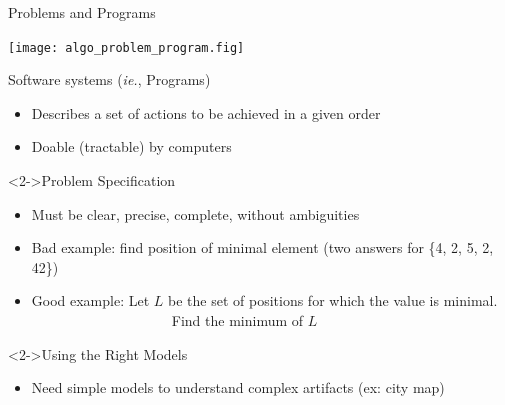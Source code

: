 \begin{frame}[t,squeeze]{Problems and Programs}
  \centerline{\texttt{[image: algo\_problem\_program.fig]}}

  \begin{block}{Software systems {\color{black} (\textit{ie.}, Programs)}}
    \begin{itemize}
    \item Describes a set of actions to be achieved in a given order
    \item Doable (tractable) by computers
    \end{itemize}
  \end{block}\vspace{-.5\baselineskip}

  \begin{block}<2->{Problem Specification}
    \begin{itemize}
    \item Must be clear, precise, complete, without ambiguities
    \item[] Bad example: find position of minimal element
      {\small (two answers for \{4, 2, 5, 2, 42\})}
    \item[] Good example: Let $L$ be the set of positions for which the value is minimal.\\
      ~~~~~~~~~~~~~~~~~~~~Find the minimum of $L$
    \end{itemize}
  \end{block}\vspace{-.5\baselineskip}

  \begin{block}<2->{Using the Right Models}
    \begin{itemize}
    \item Need simple models to understand complex artifacts (ex: city
      map)
    \end{itemize}
  \end{block}
\end{frame}
